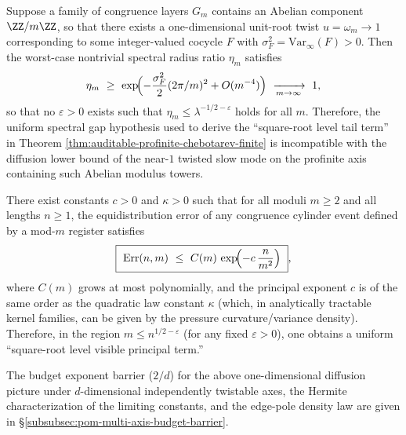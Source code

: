 \begin{corollary}\label{cor:abelian-tower-no-go}
Suppose a family of congruence layers \(G_m\) contains an Abelian component \(\ZZ/m\ZZ\), so that there exists a one-dimensional unit-root twist \(u=\omega_m\to 1\)
corresponding to some integer-valued cocycle \(F\) with \(\sigma_F^2=\mathrm{Var}_\infty(F)>0\).
Then the worst-case nontrivial spectral radius ratio \(\eta_m\) satisfies
\[
\eta_m\ \ge\ \exp\!\Bigl(-\frac{\sigma_F^2}{2}(2\pi/m)^2+O(m^{-4})\Bigr)\ \xrightarrow[m\to\infty]{}\ 1,
\]
so that no \(\varepsilon>0\) exists such that \(\eta_m\le \lambda^{-1/2-\varepsilon}\) holds for all \(m\).
Therefore, the uniform spectral gap hypothesis used to derive the ``square-root level tail term'' in Theorem \ref{thm:auditable-profinite-chebotarev-finite} is incompatible with the diffusion lower bound of the near-\(1\) twisted slow mode on the profinite axis containing such Abelian modulus towers.
\end{corollary}



\begin{conjecture}\label{conj:scaled-kernel-grh-diffusive}
There exist constants \(c>0\) and \(\kappa>0\) such that for all moduli \(m\ge 2\) and all lengths \(n\ge 1\), the equidistribution error of any congruence cylinder event defined by a mod-\(m\) register satisfies
\[
\boxed{\ \mathrm{Err}(n,m)\ \le\ C(m)\,\exp\!\Bigl(-c\,\frac{n}{m^2}\Bigr)\ },
\]
where \(C(m)\) grows at most polynomially, and the principal exponent \(c\) is of the same order as the quadratic law constant \(\kappa\) (which, in analytically tractable kernel families, can be given by the pressure curvature/variance density).
Therefore, in the region \(m\le n^{1/2-\varepsilon}\) (for any fixed \(\varepsilon>0\)), one obtains a uniform ``square-root level visible principal term.''
\end{conjecture}


The budget exponent barrier (\(2/d\)) for the above one-dimensional diffusion picture under \(d\)-dimensional independently twistable axes, the Hermite characterization of the limiting constants, and the edge-pole density law are given in \S\ref{subsubsec:pom-multi-axis-budget-barrier}.
